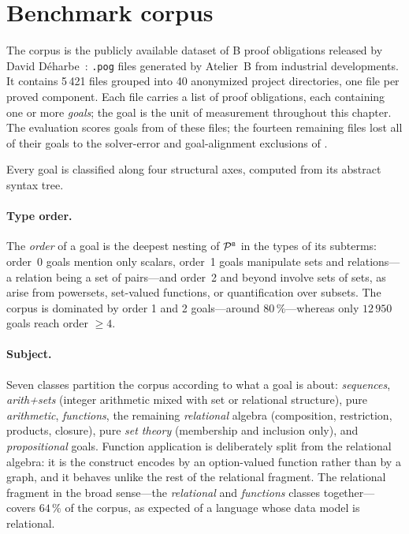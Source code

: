 \section{Benchmark corpus}
\label{sec:benchmark-corpus}

The corpus is the publicly available dataset of B proof obligations released by David D\'eharbe~\cite{deharbe2022pog}: \texttt{.pog} files generated by Atelier~B from industrial developments.
It contains 5\,421 files grouped into 40 anonymized project directories, one file per proved component.
Each file carries a list of proof obligations, each containing one or more \emph{goals}; the goal is the unit of measurement throughout this chapter.
The evaluation scores \bmGoals{} goals from \bmFiles{} of these files; the fourteen remaining files lost all of their goals to the solver-error and goal-alignment exclusions of .

Every goal is classified along four structural axes, computed from its abstract syntax tree.

\paragraph*{Type order.}
The \emph{order} of a goal is the deepest nesting of \(\mathord{\mathcal{P}^{\scriptscriptstyle{\mathsf{B}}}}\) in the types of its subterms: order~0 goals mention only scalars, order~1 goals manipulate sets and relations---a relation being a set of pairs---and order~2 and beyond involve sets of sets, as arise from powersets, set-valued functions, or quantification over subsets.
The corpus is dominated by order 1 and 2 goals---around \(80\,\%\)---whereas only \(12\,950\) goals reach order \(\ge 4\).

\paragraph*{Subject.}
Seven classes partition the corpus according to what a goal is about: \emph{sequences}, \emph{arith+sets} (integer arithmetic mixed with set or relational structure), pure \emph{arithmetic}, \emph{functions}, the remaining \emph{relational} algebra (composition, restriction, products, closure), pure \emph{set theory} (membership and inclusion only), and \emph{propositional} goals.
Function application is deliberately split from the relational algebra: it is the construct \beer{} encodes by an option-valued function rather than by a graph, and it behaves unlike the rest of the relational fragment.
The relational fragment in the broad sense---the \emph{relational} and \emph{functions} classes together---covers \(64\,\%\) of the corpus, as expected of a language whose data model is relational.

